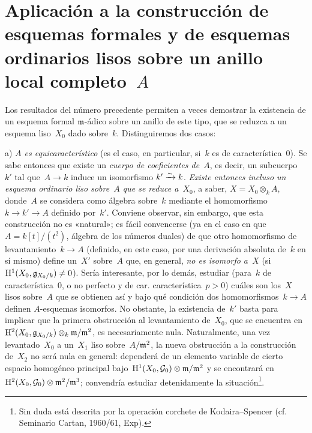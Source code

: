 
\section[Aplicación a la construcción de esquemas formales...]{Aplicación a la construcción de esquemas formales y de esquemas ordinarios lisos sobre un anillo local completo~$A$}
\label{III.7}

Los resultados del número precedente permiten a veces demostrar la existencia
de un esquema formal $\mathfrak{m}$-ádico sobre un anillo de este tipo, que se reduzca a un esquema liso~$X_0$ dado sobre~$k$. Distinguiremos dos casos:

\medskip
\noindent a) \emph{$A$ es equicaracterístico} (es el caso, en particular, si~$k$ es de característica~$0$). Se sabe entonces que existe un \emph{cuerpo de coeficientes de}~$A$, es decir, un subcuerpo~$k'$ tal que~$A\to k$ induce un isomorfismo $k'\xrightarrow{\sim} k$. \emph{Existe entonces incluso un esquema ordinario liso sobre~$A$ que se reduce a~$X_0$}, a saber, $X=X_0\otimes_kA$, donde~$A$ se considera como álgebra sobre~$k$ mediante el homomorfismo $k\to k'\to A$ definido por~$k'$. Conviene observar, sin embargo, que esta construcción no es «natural»; es fácil convencerse (ya en el caso en que $A=k[t]/(t^2)$, álgebra de los números duales) de que otro homomorfismo de levantamiento~$k\to A$ (definido, en este caso, por una derivación absoluta de~$k$ en sí mismo) define un~$X'$ sobre~$A$ que, en general, \emph{no es isomorfo a~$X$} (si~$\mathrm H^1(X_0,\mathfrak{g}_{X_0/k})\neq0$). Sería interesante, por lo demás, estudiar (para~$k$ de característica~$0$, o no perfecto y de
{car.}
{característica}~$p>0$) cuáles son los~$X$ lisos sobre~$A$ que se obtienen así y bajo qué condición dos homomorfismos~$k\to A$ definen $A$-esquemas isomorfos. No obstante, la existencia de~$k'$ basta para implicar que la primera obstrucción al levantamiento de~$X_0$, que se encuentra en~$\mathrm H^2(X_0,\mathfrak{g}_{X_0/k})\otimes_k\mathfrak{m}/\mathfrak{m}^2$, es necesariamente nula. Naturalmente, una vez levantado~$X_0$ a un~$X_1$ liso sobre~$A/\mathfrak{m}^2$, la nueva obstrucción a la construcción de~$X_2$ no será nula en general: dependerá de un elemento variable de cierto espacio homogéneo principal bajo~$\mathrm H^1(X_0,\mathcal{G}_0)\otimes\mathfrak{m}/\mathfrak{m}^2$ y se encontrará en~$\mathrm H^2(X_0,\mathcal{G}_0)\otimes\mathfrak{m}^2/\mathfrak{m}^3$; convendría estudiar detenidamente la situación\footnote{Sin duda está descrita por la operación corchete de Kodaira--Spencer (cf. Seminario Cartan, 1960/61, Exp).}.

